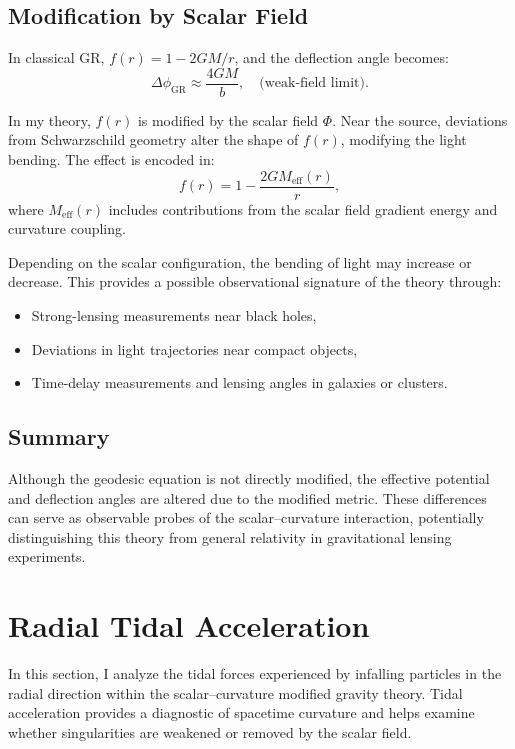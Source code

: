 \documentclass[12pt]{article}
\begin{document}
\subsection{Modification by Scalar Field}

In classical GR, \( f(r) = 1 - 2GM/r \), and the deflection angle becomes:
\[
\Delta\phi_{\text{GR}} \approx \frac{4GM}{b}, \quad \text{(weak-field limit)}.
\]

In my theory, \( f(r) \) is modified by the scalar field \( \Phi \). Near the source, deviations from Schwarzschild geometry alter the shape of \( f(r) \), modifying the light bending. The effect is encoded in:
\[
f(r) = 1 - \frac{2G M_{\text{eff}}(r)}{r},
\]
where \( M_{\text{eff}}(r) \) includes contributions from the scalar field gradient energy and curvature coupling.

Depending on the scalar configuration, the bending of light may increase or decrease. This provides a possible observational signature of the theory through:
\begin{itemize}
    \item Strong-lensing measurements near black holes,
    \item Deviations in light trajectories near compact objects,
    \item Time-delay measurements and lensing angles in galaxies or clusters.
\end{itemize}

\subsection{Summary}

Although the geodesic equation is not directly modified, the effective potential and deflection angles are altered due to the modified metric. These differences can serve as observable probes of the scalar--curvature interaction, potentially distinguishing this theory from general relativity in gravitational lensing experiments.

\section{Radial Tidal Acceleration}

In this section, I analyze the tidal forces experienced by infalling particles in the radial direction within the scalar--curvature modified gravity theory. Tidal acceleration provides a diagnostic of spacetime curvature and helps examine whether singularities are weakened or removed by the scalar field.
\end{document}
